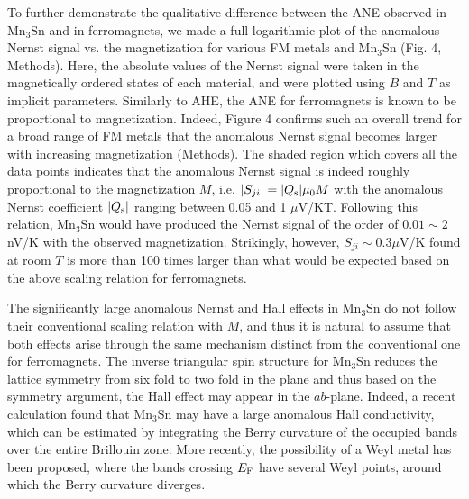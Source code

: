 \documentclass[amsmath,amssymb]{nature}
\begin{document}
To further demonstrate the qualitative difference between the ANE observed in Mn$_3$Sn and in ferromagnets, we made a full logarithmic plot of the anomalous Nernst signal vs. the magnetization for various FM metals and Mn$_3$Sn (Fig. 4, Methods). Here, the absolute values of the Nernst signal were taken in the magnetically ordered states of each material, and were plotted using $B$ and $T$ as implicit parameters. Similarly to AHE\cite{Nagaosa2010}, the ANE for ferromagnets is known to be proportional to magnetization. Indeed, Figure 4 confirms such an overall trend for a broad range of FM metals that the anomalous Nernst signal becomes larger with increasing magnetization (Methods). The shaded region which covers all the data points indicates that the anomalous Nernst signal is indeed roughly proportional to the magnetization $M$, i.e. $|S_{ji}| = |Q_{\rm s}|\mu_0M$ with the anomalous Nernst coefficient $|Q_{\rm s}|$ ranging between 0.05 and 1 $\mu$V/KT. Following this relation, Mn$_3$Sn would have produced the Nernst signal of the order of $0.01 \sim 2$ nV/K with the observed magnetization. Strikingly, however, $S_{ji}\sim 0.3 \mu$V/K found at room $T$ is more than 100 times larger than what would be expected based on the above scaling relation for ferromagnets. 

The significantly large anomalous Nernst and Hall effects in Mn$_3$Sn do not follow their conventional scaling relation with $M$, and thus it is natural to assume that both effects arise through the same mechanism distinct from the conventional one for ferromagnets. The inverse triangular spin structure for Mn$_3$Sn reduces the lattice symmetry from six fold to two fold in the plane and thus based on the symmetry argument, the Hall effect may appear in the $ab$-plane\cite{suzuki2016cluster}. Indeed, a recent calculation found that Mn$_3$Sn may have a large anomalous Hall conductivity\cite{Kubler2014}, which can be estimated by integrating the Berry curvature of the occupied bands over the entire Brillouin zone\cite{Niu2010}. More recently, the possibility of a Weyl metal has been proposed, where the bands crossing $E_{\rm F}$ have several Weyl points, around which the Berry curvature diverges\cite{Yang2016}.  
\end{document}

